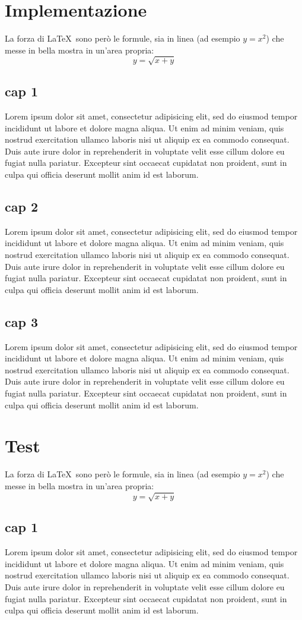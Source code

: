 \documentclass[a4paper,10pt]{report} %
\begin{document}
\chapter{Implementazione} %
  La forza di \LaTeX\ sono però le formule, sia in linea (ad esempio \(y=x^2\))
   che messe in bella mostra in un'area propria:
  \[y=\sqrt{x+y}\]
  \section{cap 1}
    Lorem ipsum dolor sit amet, consectetur adipisicing elit, sed do eiusmod tempor incididunt ut labore et dolore magna aliqua. Ut enim ad minim veniam, quis nostrud exercitation ullamco laboris nisi ut aliquip ex ea commodo consequat. Duis aute irure dolor in reprehenderit in voluptate velit esse cillum dolore eu fugiat nulla pariatur. Excepteur sint occaecat cupidatat non proident, sunt in culpa qui officia deserunt mollit anim id est laborum.
  \section{cap 2}
    Lorem ipsum dolor sit amet, consectetur adipisicing elit, sed do eiusmod tempor incididunt ut labore et dolore magna aliqua. Ut enim ad minim veniam, quis nostrud exercitation ullamco laboris nisi ut aliquip ex ea commodo consequat. Duis aute irure dolor in reprehenderit in voluptate velit esse cillum dolore eu fugiat nulla pariatur. Excepteur sint occaecat cupidatat non proident, sunt in culpa qui officia deserunt mollit anim id est laborum.
  \section{cap 3}
    Lorem ipsum dolor sit amet, consectetur adipisicing elit, sed do eiusmod tempor incididunt ut labore et dolore magna aliqua. Ut enim ad minim veniam, quis nostrud exercitation ullamco laboris nisi ut aliquip ex ea commodo consequat. Duis aute irure dolor in reprehenderit in voluptate velit esse cillum dolore eu fugiat nulla pariatur. Excepteur sint occaecat cupidatat non proident, sunt in culpa qui officia deserunt mollit anim id est laborum.
\newpage
\chapter{Test} %
  La forza di \LaTeX\ sono però le formule, sia in linea (ad esempio \(y=x^2\))
   che messe in bella mostra in un'area propria:
  \[y=\sqrt{x+y}\]
  \section{cap 1}
    Lorem ipsum dolor sit amet, consectetur adipisicing elit, sed do eiusmod tempor incididunt ut labore et dolore magna aliqua. Ut enim ad minim veniam, quis nostrud exercitation ullamco laboris nisi ut aliquip ex ea commodo consequat. Duis aute irure dolor in reprehenderit in voluptate velit esse cillum dolore eu fugiat nulla pariatur. Excepteur sint occaecat cupidatat non proident, sunt in culpa qui officia deserunt mollit anim id est laborum.
\end{document}
